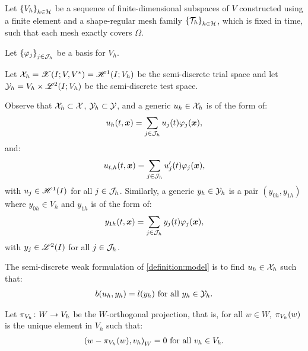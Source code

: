 Let $\left\{ V_h \right\}_{h \in \mathcal{H}}$ be a sequence of finite-dimensional subspaces of $V$ constructed using a finite element and a shape-regular mesh family $\left\{ \mathcal{T}_h \right\}_{h \in \mathcal{H}}$, which is fixed in time, such that each mesh exactly covers $\Omega$.

Let $\left\{ \varphi_j \right\}_{j \in \mathcal{J}_h}$ be a basis for $V_h$.

\begin{definition}
    Let $\mathcal{X}_h = \mathscr{X}(I; V, V^*) = \mathscr{H}^{1}(I; V_h)$ be the semi-discrete trial space and let $\mathcal{Y}_h = V_h \times \mathscr{L}^{2}(I; V_h)$ be the semi-discrete test space.
\end{definition}

Observe that $\mathcal{X}_h \subset \mathcal{X}$, $\mathcal{Y}_h \subset \mathcal{Y}$, and a generic $u_h \in \mathcal{X}_h$ is of the form of:
\begin{gather}
    u_h(t, \bm{x}) = \sum_{j \in \mathcal{J}_h} u_j(t) \varphi_j(\bm{x}),
\end{gather}
and:
\begin{gather}
    u_{t, h}(t, \bm{x}) = \sum_{j \in \mathcal{J}_h} u_j^{\prime}(t) \varphi_j(\bm{x}),
\end{gather}
with $u_j \in \mathscr{H}^{1}(I)$ for all $j \in \mathcal{J}_h$. Similarly, a generic $y_h \in \mathcal{Y}_h$ is a pair $(y_{0h}, y_{1h})$ where $y_{0h} \in V_h$ and $y_{1h}$ is of the form of:
\begin{gather}
    y_{1h}(t, \bm{x}) = \sum_{j \in \mathcal{J}_h} y_j(t) \varphi_j(\bm{x}),
\end{gather}
with $y_j \in \mathscr{L}^{2}(I)$ for all $j \in \mathcal{J}_h$.

\begin{definition}
    The semi-discrete weak formulation of \ref{definition:model} is to find $u_h \in \mathcal{X}_h$ such that:
    \begin{gather} \label{equation:weak_h1}
        b(u_h, y_h) = l(y_h) \text{ for all } y_h \in \mathcal{Y}_h.
    \end{gather}
\end{definition}

\begin{definition}[$\proj{V_h}$]
    Let $\pi_{V_h} \colon W \rightarrow V_h$ be the $W$-orthogonal projection, that is, for all $w \in W$, $\pi_{V_h}(w)$ is the unique element in $V_h$ such that:
    \begin{gather}
        \left( w - \pi_{V_h}(w), v_h \right)_W = 0 \text{ for all } v_h \in V_h.
    \end{gather}
\end{definition}

